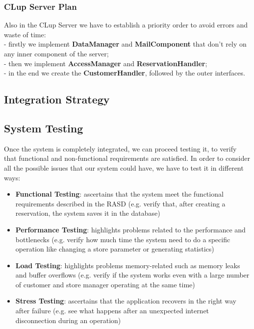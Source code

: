\documentclass{article}
\begin{document}
		\subsubsection{CLup Server Plan}
		Also in the CLup Server we have to establish a priority order to avoid errors and waste of time:\\
		- firstly we implement \textbf{DataManager} and \textbf{MailComponent} that don't rely on any inner component of the server;\\
		- then we implement \textbf{AccessManager} and \textbf{ReservationHandler};\\
		- in the end we create the \textbf{CustomerHandler}, followed by the outer interfaces.\\
		
		
		
		
	
	\subsection{Integration Strategy}
	
	\subsection{System Testing}
	Once the system is completely integrated, we can proceed testing it, to verify that functional and non-functional requirements are satisfied.
	In order to consider all the possible issues that our system could have, we have to test it in different ways:
	\begin{itemize}
		\item \textbf{Functional Testing}: ascertains that the system meet the functional requirements described in the RASD (e.g. verify that, after creating a reservation, the system saves it in the database)
		\item \textbf{Performance Testing}: highlights problems related to the performance and bottlenecks (e.g. verify how much time the system need to do a specific operation like changing a store parameter or generating statistics)
		\item \textbf{Load Testing}: highlights problems memory-related such as memory leaks and buffer overflows (e.g. verify if the system works even with a large number of customer and store manager operating at the same time)
		\item \textbf{Stress Testing}: ascertains that the application recovers in the right way after failure (e.g. see what happens after an unexpected internet disconnection during an operation)
	\end{itemize}
		
\end{document}
